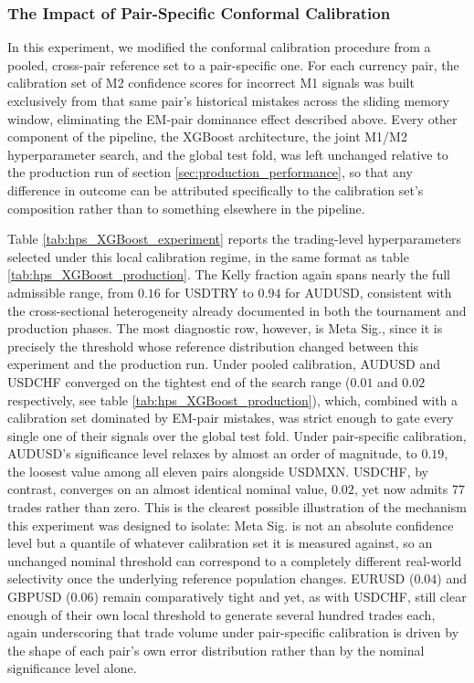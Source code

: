 \documentclass[12pt, a4paper]{article}
\begin{document}
\subsubsection{The Impact of Pair-Specific Conformal Calibration}

In this experiment, we modified the conformal calibration procedure from a pooled, cross-pair reference set to a pair-specific one. For each currency pair, 
the calibration set of M2 confidence scores for incorrect M1 signals was built exclusively from that same pair's historical mistakes across the sliding memory window, 
eliminating the EM-pair dominance effect described above. Every other component of the pipeline, the XGBoost architecture, the joint M1/M2 hyperparameter search, and 
the global test fold, was left unchanged relative to the production run of section \ref{sec:production_performance}, so that any difference in outcome can be attributed 
specifically to the calibration set's composition rather than to something elsewhere in the pipeline.



Table \ref{tab:hps_XGBoost_experiment} reports the trading-level hyperparameters selected under this local calibration regime, in the same format as table 
\ref{tab:hps_XGBoost_production}. The Kelly fraction again spans nearly the full admissible range, from $0.16$ for USDTRY to $0.94$ for AUDUSD, consistent with the 
cross-sectional heterogeneity already documented in both the tournament and production phases. The most diagnostic row, however, is Meta Sig., since it is 
precisely the threshold whose reference distribution changed between this experiment and the production run. Under pooled calibration, AUDUSD and USDCHF converged 
on the tightest end of the search range ($0.01$ and $0.02$ respectively, see table \ref{tab:hps_XGBoost_production}), which, combined with a calibration set 
dominated by EM-pair mistakes, was strict enough to gate every single one of their signals over the global test fold. Under pair-specific calibration, AUDUSD's 
significance level relaxes by almost an order of magnitude, to $0.19$, the loosest value among all eleven pairs alongside USDMXN. USDCHF, by contrast, converges on 
an almost identical nominal value, $0.02$, yet now admits $77$ trades rather than zero. This is the clearest possible illustration of the mechanism this experiment 
was designed to isolate: Meta Sig. is not an absolute confidence level but a quantile of whatever calibration set it is measured against, so an unchanged nominal 
threshold can correspond to a completely different real-world selectivity once the underlying reference population changes. EURUSD ($0.04$) and GBPUSD ($0.06$) 
remain comparatively tight and yet, as with USDCHF, still clear enough of their own local threshold to generate several hundred trades each, again underscoring 
that trade volume under pair-specific calibration is driven by the shape of each pair's own error distribution rather than by the nominal significance level alone.
\end{document}
